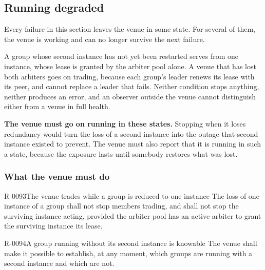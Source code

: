 \subsection{Running degraded}
\label{sec:ha:enabled:degraded}

Every failure in this section leaves the venue in some state. For several of
them, the venue is working and can no longer survive the next failure.

A group whose second instance has not yet been restarted serves from one
instance, whose lease is granted by the arbiter pool alone. A venue that has lost
both arbiters goes on trading, because each group's leader renews its lease with
its peer, and cannot replace a leader that fails. Neither condition stops
anything, neither produces an error, and an observer outside the venue cannot
distinguish either from a venue in full health.

\textbf{The venue must go on running in these states.} Stopping when it loses
redundancy would turn the loss of a second instance into the outage that second
instance existed to prevent. The venue must also report that it is running in
such a state, because the exposure lasts until somebody restores what was lost.

\subsubsection{What the venue must do}
\label{sec:ha:enabled:degraded:behaviour}

\begin{requirement}{R-0093}{The venue trades while a group is reduced to one instance}
  The loss of one instance of a group shall not stop members trading, and shall
  not stop the surviving instance acting, provided the arbiter pool has an active
  arbiter to grant the surviving instance its lease.
\end{requirement}

\begin{requirement}{R-0094}{A group running without its second instance is knowable}
  The venue shall make it possible to establish, at any moment, which groups are
  running with a second instance and which are not.
\end{requirement}

